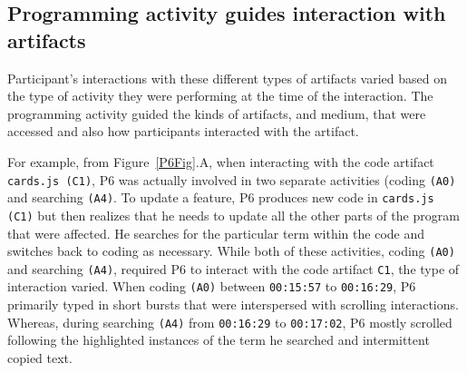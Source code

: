 



\subsection{Programming activity guides interaction with artifacts}


Participant's interactions with these different types of artifacts varied based on the type of activity they were performing at the time of the interaction. The programming activity guided the kinds of artifacts, and medium, that were accessed and also how participants interacted with the artifact.


For example, from Figure~\ref{P6Fig}.A, when interacting with the code artifact \texttt{cards.js (C1)}, P6 was actually involved in two separate activities (coding \texttt{(A0)} and searching \texttt{(A4)}. To update a feature, P6 produces new code in \texttt{cards.js (C1)} but then realizes that he needs to update all the other parts of the program that were affected. He searches for the particular term within the code and switches back to coding as necessary. While both of these activities, coding \texttt{(A0)} and searching \texttt{(A4)}, required P6 to interact with the code artifact \texttt{C1}, the type of interaction varied. When coding \texttt{(A0)} between \texttt{00:15:57} to \texttt{00:16:29}, P6 primarily typed in short bursts that were interspersed with scrolling interactions. Whereas, during searching \texttt{(A4)} from \texttt{00:16:29} to \texttt{00:17:02}, P6 mostly scrolled following the highlighted instances of the term he searched and intermittent copied text.

